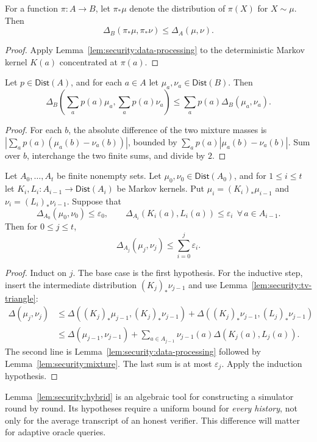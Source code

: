 \begin{corollary}\label{cor:security:projection}
For a function $\pi:A\to B$, let $\pi_*\mu$ denote the distribution of $\pi(X)$ for $X\sim\mu$. Then
\[
 \Delta_B(\pi_*\mu,\pi_*\nu)\leq\Delta_A(\mu,\nu).
\]
\end{corollary}
\begin{proof}
Apply Lemma~\ref{lem:security:data-processing} to the deterministic Markov kernel $K(a)$ concentrated at $\pi(a)$.
\end{proof}

\begin{lemma}\label{lem:security:mixture}
Let $p\in\mathsf{Dist}(A)$, and for each $a\in A$ let $\mu_a,\nu_a\in\mathsf{Dist}(B)$. Then
\[
 \Delta_B\left(\sum_a p(a)\mu_a,\sum_a p(a)\nu_a\right)
 \leq\sum_a p(a)\Delta_B(\mu_a,\nu_a).
\]
\end{lemma}
\begin{proof}
For each $b$, the absolute difference of the two mixture masses is
$\left|\sum_ap(a)(\mu_a(b)-\nu_a(b))\right|$, bounded by
$\sum_ap(a)|\mu_a(b)-\nu_a(b)|$. Sum over $b$, interchange the two finite sums, and divide by $2$.
\end{proof}

\begin{lemma}\label{lem:security:hybrid}
Let $A_0,\ldots,A_t$ be finite nonempty sets. Let
$\mu_0,\nu_0\in\mathsf{Dist}(A_0)$, and for $1\leq i\leq t$
let $K_i,L_i:A_{i-1}\to\mathsf{Dist}(A_i)$ be Markov kernels.
Put $\mu_i=(K_i)_*\mu_{i-1}$ and $\nu_i=(L_i)_*\nu_{i-1}$.
Suppose that
\[
 \Delta_{A_0}(\mu_0,\nu_0)\leq\varepsilon_0,\qquad
 \Delta_{A_i}(K_i(a),L_i(a))\leq\varepsilon_i
 \ \ \forall\,a\in A_{i-1}.
\]
Then for $0\leq j\leq t$,
\[
 \Delta_{A_j}(\mu_j,\nu_j)\leq\sum_{i=0}^j\varepsilon_i.
\]
\end{lemma}
\begin{proof}
Induct on $j$. The base case is the first hypothesis. For the inductive step, insert the intermediate distribution $(K_j)_*\nu_{j-1}$ and use Lemma~\ref{lem:security:tv-triangle}:
\begin{align*}
 \Delta(\mu_j,\nu_j)
 &\leq\Delta((K_j)_*\mu_{j-1},(K_j)_*\nu_{j-1})
 +\Delta((K_j)_*\nu_{j-1},(L_j)_*\nu_{j-1})\\
 &\leq\Delta(\mu_{j-1},\nu_{j-1})
 +\sum_{a\in A_{j-1}}\nu_{j-1}(a)\Delta(K_j(a),L_j(a)).
\end{align*}
The second line is Lemma~\ref{lem:security:data-processing} followed by Lemma~\ref{lem:security:mixture}. The last sum is at most $\varepsilon_j$. Apply the induction hypothesis.
\end{proof}

\begin{remark}
Lemma~\ref{lem:security:hybrid} is an algebraic tool for constructing a simulator round by round. Its hypotheses require a uniform bound for \emph{every history}, not only for the average transcript of an honest verifier. This difference will matter for adaptive oracle queries.
\end{remark}
